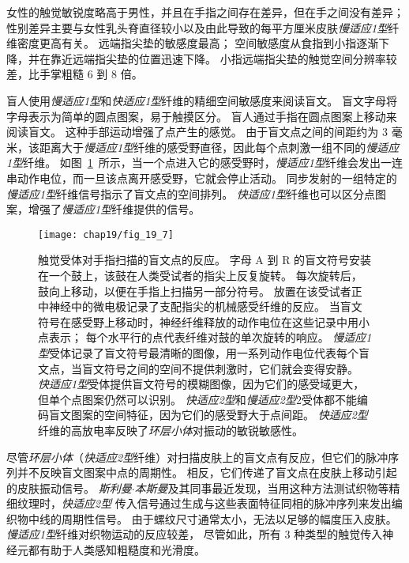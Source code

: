 女性的触觉敏锐度略高于男性，并且在手指之间存在差异，但在手之间没有差异；
性别差异主要与女性乳头脊直径较小以及由此导致的每平方厘米皮肤\textit{慢适应1型}纤维密度更高有关。
远端指尖垫的敏感度最高；
空间敏感度从食指到小指逐渐下降，并在靠近远端指尖垫的位置迅速下降。
小指远端指尖垫的触觉空间分辨率较差，比手掌粗糙 6 到 8 倍。


盲人使用\textit{慢适应1型}和\textit{快适应1型}纤维的精细空间敏感度来阅读盲文。
盲文字母将字母表示为简单的圆点图案，易于触摸区分。
盲人通过手指在圆点图案上移动来阅读盲文。
这种手部运动增强了点产生的感觉。
由于盲文点之间的间距约为 3 毫米，该距离大于\textit{慢适应1型}纤维的感受野直径，因此每个点刺激一组不同的\textit{慢适应1型}纤维。
如图~\ref{fig:19_7}~所示，当一个点进入它的感受野时，\textit{慢适应1型}纤维会发出一连串动作电位，而一旦该点离开感受野，它就会停止活动。
同步发射的一组特定的\textit{慢适应1型}纤维信号指示了盲文点的空间排列。
\textit{快适应1型}纤维也可以区分点图案，增强了\textit{慢适应1型}纤维提供的信号。


\begin{figure}[htbp]
	\centering
	\texttt{[image: chap19/fig\_19\_7]}
	\caption{触觉受体对手指扫描的盲文点的反应。
		字母 A 到 R 的盲文符号安装在一个鼓上，该鼓在人类受试者的指尖上反复旋转。
		每次旋转后，鼓向上移动，以便在手指上扫描另一部分符号。
		放置在该受试者正中神经中的微电极记录了支配指尖的机械感受纤维的反应。
		当盲文符号在感受野上移动时，神经纤维释放的动作电位在这些记录中用小点表示； 每个水平行的点代表纤维对鼓的单次旋转的响应。
		\textit{慢适应1型}受体记录了盲文符号最清晰的图像，用一系列动作电位代表每个盲文点，当盲文符号之间的空间不提供刺激时，它们就会变得安静。
		\textit{快适应1型}受体提供盲文符号的模糊图像，因为它们的感受域更大，但单个点图案仍然可以识别。 
		\textit{快适应2型}和\textit{慢适应2型}2受体都不能编码盲文图案的空间特征，因为它们的感受野大于点间距。
		\textit{快适应2型}纤维的高放电率反映了\textit{环层小体}对振动的敏锐敏感性\cite{phillips1990representation}。}
	\label{fig:19_7}
\end{figure}


尽管\textit{环层小体}（\textit{快适应2型}纤维）对扫描皮肤上的盲文点有反应，但它们的脉冲序列并不反映盲文图案中点的周期性。
相反，它们传递了盲文点在皮肤上移动引起的皮肤振动信号。
\textit{斯利曼$\cdot$本斯曼}及其同事最近发现，当用这种方法测试织物等精细纹理时，\textit{快适应2型} 传入信号通过生成与这些表面特征同相的脉冲序列来发出编织物中线的周期性信号。
由于螺纹尺寸通常太小，无法以足够的幅度压入皮肤。\textit{慢适应1型}纤维对织物运动的反应较差，
尽管如此，所有 3 种类型的触觉传入神经元都有助于人类感知粗糙度和光滑度。


